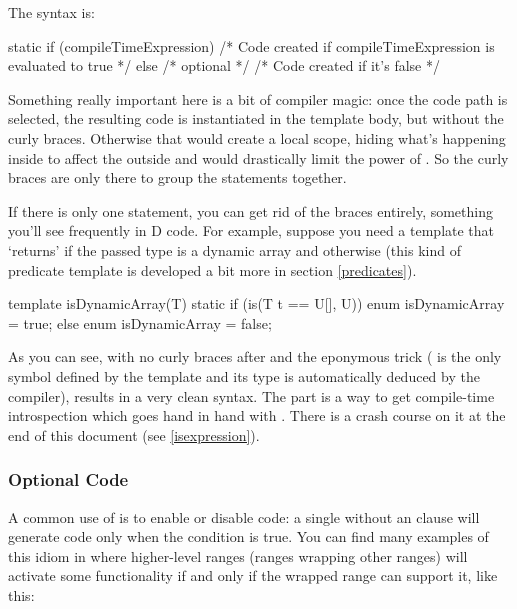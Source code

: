 The syntax is:
\begin{dcode}
static if (compileTimeExpression)
{
     /* Code created if compileTimeExpression is evaluated to true */
}
else /* optional */
{
     /* Code created if it's false */
}
\end{dcode}

Something really important here is a bit of compiler magic: once the code path is selected, the resulting code is instantiated in the template body, but without the curly braces. Otherwise that would create a local scope, hiding what's happening inside to affect the outside and would drastically limit the power of . So the curly braces are only there to group the statements together. 

If there is only one statement, you can get rid of the braces entirely, something you'll see frequently in D code. For example, suppose you need a template that `returns'  if the passed type is a dynamic array and  otherwise (this kind of predicate template is developed a bit more in section \ref{predicates}).

\begin{dcode}
template isDynamicArray(T)
{
    static if (is(T t == U[], U))
        enum isDynamicArray = true;
    else
        enum isDynamicArray = false;
}
\end{dcode}

As you can see, with no curly braces after  and the eponymous trick ( is the only symbol defined by the template and its type is automatically deduced by the compiler), results in a very clean syntax. The \DD{()} part is a way to get compile-time introspection which goes hand in hand with . There is a crash course on it at the end of this document (see \autoref{isexpression}).

\subsubsection{Optional Code}

A common use of  is to enable or disable code: a single  without an  clause will generate code only when the condition is true. You can find many examples of this idiom in  where higher-level ranges (ranges wrapping other ranges) will activate some functionality if and only if the wrapped range can support it, like this:


